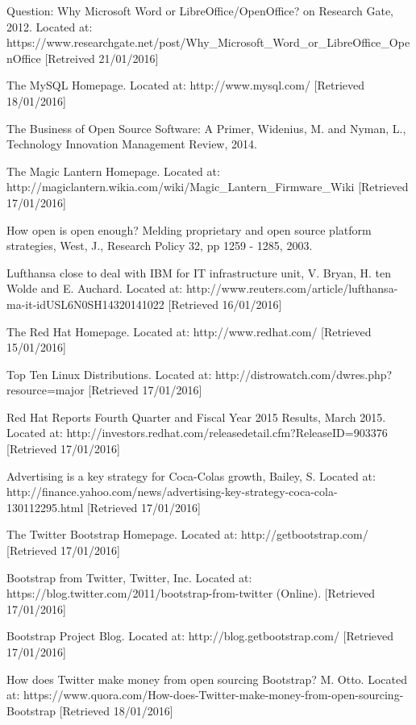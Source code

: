 \begin{thebibliography}{100}
 Question: Why Microsoft Word or LibreOffice/OpenOffice? on Research Gate,
2012.
Located at: https://www.researchgate.net/post/Why\_Microsoft\_Word\_or\_LibreOffice\_OpenOffice [Retreived 21/01/2016]

 The MySQL Homepage.
  Located at: http://www.mysql.com/ [Retrieved 18/01/2016]

 The Business of Open Source Software: A Primer,
    Widenius, M. and Nyman, L.,
    Technology Innovation Management Review,
    2014.

 The Magic Lantern Homepage.
  Located at: http://magiclantern.wikia.com/wiki/Magic\_Lantern\_Firmware\_Wiki [Retrieved 17/01/2016]

 How open is open enough? Melding proprietary and open source platform strategies,
  West, J.,
  Research Policy 32,
  pp 1259 - 1285,
  2003.

 Lufthansa close to deal with IBM for IT infrastructure unit,
  V. Bryan, H. ten Wolde and E. Auchard.
  Located at: http://www.reuters.com/article/lufthansa-ma-it-idUSL6N0SH14320141022 [Retrieved 16/01/2016]

 The Red Hat Homepage.
  Located at: http://www.redhat.com/ [Retrieved 15/01/2016]

 Top Ten Linux Distributions.
  Located at: http://distrowatch.com/dwres.php?resource=major [Retrieved 17/01/2016]

 Red Hat Reports Fourth Quarter and Fiscal Year 2015 Results,
  March 2015.
  Located at: http://investors.redhat.com/releasedetail.cfm?ReleaseID=903376 [Retrieved 17/01/2016]
  
 Advertising is a key strategy for Coca-Colas growth,
  Bailey, S.
  Located at:  http://finance.yahoo.com/news/advertising-key-strategy-coca-cola-130112295.html [Retrieved 17/01/2016]

 The Twitter Bootstrap Homepage.
  Located at:  http://getbootstrap.com/ [Retrieved 17/01/2016]

 Bootstrap from Twitter, 
  Twitter, Inc.
  Located at: https://blog.twitter.com/2011/bootstrap-from-twitter (Online). [Retrieved 17/01/2016]

 Bootstrap Project Blog.
  Located at: http://blog.getbootstrap.com/ [Retrieved 17/01/2016]

 How does Twitter make money from open sourcing Bootstrap?
  M. Otto.
  Located at: https://www.quora.com/How-does-Twitter-make-money-from-open-sourcing-Bootstrap [Retrieved 18/01/2016]


\end{thebibliography}
